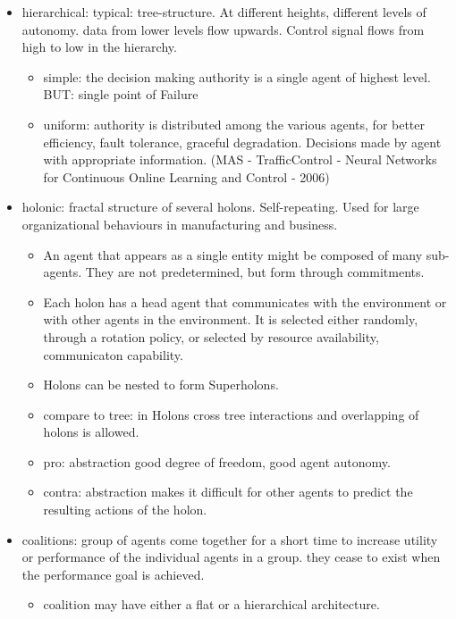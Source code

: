 \begin{itemize}[noitemsep,nolistsep]
	\item hierarchical: typical: tree-structure. At different heights, different levels of autonomy. data from lower levels flow upwards. Control signal flows from high to low in the hierarchy.
	\begin{itemize}[noitemsep,nolistsep]
		\item simple: the decision making authority is a single agent of highest level. BUT: single point of Failure
		\item uniform: authority is distributed among the various agents, for better efficiency, fault tolerance, graceful degradation. Decisions made by agent with appropriate information. (MAS - TrafficControl - Neural Networks for Continuous Online Learning and Control - 2006)
	\end{itemize}
	\item holonic: fractal structure of several holons. Self-repeating. Used for large organizational behaviours in manufacturing and business. 
	\begin{itemize}[noitemsep,nolistsep]
		\item An agent that appears as a single entity might be composed of many sub-agents. They are not predetermined, but form through commitments.
		\item Each holon has a head agent that communicates with the environment or with other agents in the environment. It is selected either randomly, through a rotation policy, or selected by resource availability, communicaton capability.
		\item Holons can be nested to form Superholons.
		\item compare to tree: in Holons cross tree interactions and overlapping of holons is allowed.
		\item pro: abstraction good degree of freedom, good agent autonomy.
		\item contra: abstraction makes it difficult for other agents to predict the resulting actions of the holon.
	\end{itemize}
	\item coalitions: group of agents come together for a short time to increase utility or performance of the individual agents in a group. they cease to exist when the performance goal is achieved.
	\begin{itemize}[noitemsep,nolistsep]
		\item coalition may have either a flat or a hierarchical architecture.

\end{itemize}
\end{itemize}
